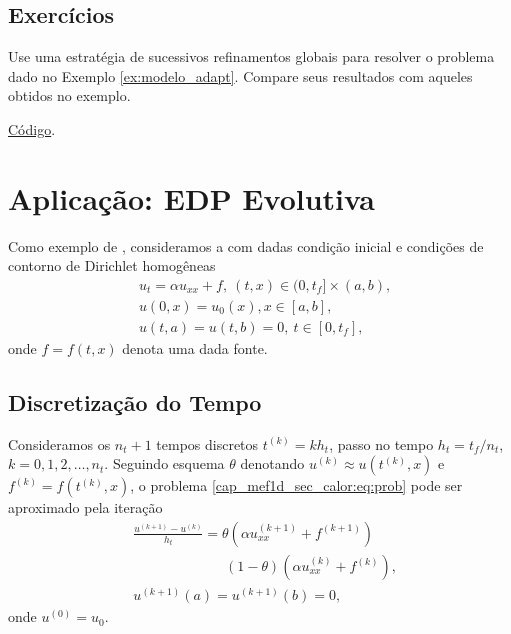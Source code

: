 \subsection{Exercícios}
\badgeRevisar

\begin{exer}\label{exer:modelo_refglobal}
  Use uma estratégia de sucessivos refinamentos globais para resolver o problema dado no Exemplo \ref{ex:modelo_adapt}. Compare seus resultados com aqueles obtidos no exemplo.
\end{exer}
\begin{resp}
  \ifispython
  \href{https://github.com/phkonzen/notas/blob/master/src/MetodoElementosFinitos/cap_mef1d/dados/exer_dcr/exer_dcr.py}{Código}.
  \fi  
\end{resp}

\section{Aplicação: EDP Evolutiva}\label{cap_mef1d_sec_calor}
\badgeConstrucao

Como exemplo de , consideramos a  com dadas condição inicial e condições de contorno de Dirichlet homogêneas
\begin{subequations}\label{cap_mef1d_sec_calor:eq:prob}
  \begin{align}
    &u_t = \alpha u_{xx} + f, ~(t,x)\in (0, t_f]\times (a, b),\\
    &u(0, x) = u_0(x), x\in [a, b],\\
    &u(t, a) = u(t, b) = 0, ~t\in [0, t_f],
  \end{align}
\end{subequations}
onde $f = f(t, x)$ denota uma dada fonte.

\subsection{Discretização do Tempo}

Consideramos os $n_t+1$ tempos discretos $t^{(k)} = k h_t$, passo no tempo $h_t = t_f/n_t$, $k = 0, 1, 2, \dotsc, n_t$. Seguindo esquema $\theta$ denotando $u^{(k)} \approx u\left(t^{(k)}, x\right)$ e $f^{(k)} = f\left(t^{(k)}, x\right)$, o problema \eqref{cap_mef1d_sec_calor:eq:prob} pode ser aproximado pela iteração
\begin{subequations}\label{cap_mef1d_sec_calor:eq:theta}
  \begin{align}
    &\frac{u^{(k+1)} - u^{(k)}}{h_t} = \theta \left(\alpha u^{(k+1)}_{xx} + f^{(k+1)}\right)\nonumber\\
    &\qquad\qquad\qquad\;\; (1-\theta) \left(\alpha u^{(k)}_{xx} + f^{(k)}\right),\\
    &u^{(k+1)}(a) = u^{(k+1)}(b) = 0,
  \end{align}
\end{subequations}
onde $u^{(0)} = u_0$. 

